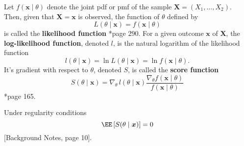 \begin{defe} \label{defe: likelihood_function}
    Let $f(\bm{x} \mid \theta)$ denote the joint pdf or pmf of the sample $\bm{X} = (X_1 , \ldots , X_2)$. Then, given that $\bm{X} = \bm{x}$ is observed, the function of $\theta$ defined by
    \begin{equation*}
        L(\theta \mid \bm{x}) = f(\bm{x} \mid \theta)
    \end{equation*}
    is called the {\bf likelihood function} \cite{CasellaGeorge2001SI}*{page 290}. For a given outcome $\bm{x}$ of $\bm{X}$, the {\bf log-likelihood function}, denoted $l$, is the natural logarithm of the likelihood function
    \begin{equation*}
        l(\theta \mid \bm{x}) = \ln L(\theta \mid \bm{x}) = \ln f(\bm{x} \mid \theta).
    \end{equation*}
    It's gradient with respect to $\theta$, denoted $S$, is called the {\bf score function}
    \begin{equation*}
        S (\theta \mid \bm{x}) = \nabla_{\theta} \, l (\theta \mid \bm{x}) \frac{\nabla_{\theta} f(\bm{x} \mid \theta)}{f(\bm{x} \mid \theta)}
    \end{equation*}
    \cite{KroeseDirkP2013SMaC}*{page 165}.
\end{defe}

\begin{thm} \label{thm: e_score}
    Under regularity conditions
    \begin{equation*}
        \EE \left[ S (\theta \mid \bm{x}) \right] = 0
    \end{equation*}
    [Background Notes, page 10].
\end{thm}

